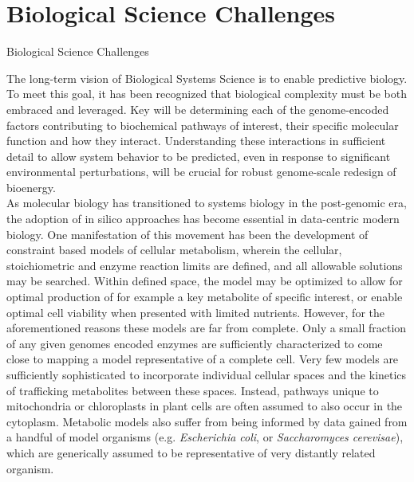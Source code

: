\documentclass[11pt]{article}
\begin{document}
\section{Biological Science Challenges}
Biological Science Challenges

The long-term vision of Biological Systems Science is to enable predictive biology. To meet this goal, it has been recognized that biological complexity must be both embraced and leveraged. Key will be determining each of the genome-encoded factors contributing to biochemical pathways of interest, their specific molecular function and how they interact. Understanding these interactions in sufficient detail to allow system behavior to be predicted, even in response to significant environmental perturbations, will be crucial for robust genome-scale redesign of bioenergy. 
\\
As molecular biology has transitioned to systems biology in the post-genomic era, the adoption of in silico approaches has become essential in data-centric modern biology. One manifestation of this movement has been the development of constraint based models of cellular metabolism, wherein the cellular, stoichiometric and enzyme reaction limits are defined, and all allowable solutions may be searched. Within defined space, the model may be optimized to allow for optimal production of for example a key metabolite of specific interest, or enable optimal cell viability when presented with limited nutrients. However, for the aforementioned reasons these models are far from complete. Only a small fraction of any given genomes encoded enzymes are sufficiently characterized to come close to mapping a model representative of a complete cell. Very few models are sufficiently sophisticated to incorporate individual cellular spaces and the kinetics of trafficking metabolites between these spaces. Instead, pathways unique to mitochondria or chloroplasts in plant cells are often assumed to also occur in the cytoplasm. Metabolic models also suffer from being informed by data gained from a handful of model organisms (e.g. \textit{Escherichia coli}, or \textit{Saccharomyces cerevisae}), which are generically assumed to be representative of very distantly related organism.
\\
\end{document}
